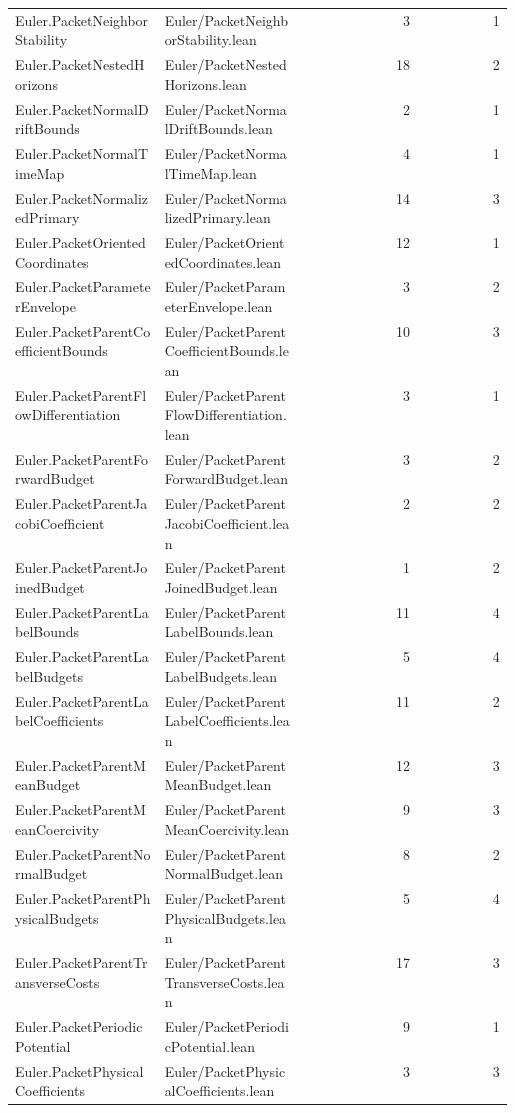 \begin{longtable}{p{0.30\linewidth}p{0.28\linewidth}rr}
Euler.PacketNeighborStability & Euler/PacketNeighborStability.lean & 3 & 1\\
Euler.PacketNestedHorizons & Euler/PacketNestedHorizons.lean & 18 & 2\\
Euler.PacketNormalDriftBounds & Euler/PacketNormalDriftBounds.lean & 2 & 1\\
Euler.PacketNormalTimeMap & Euler/PacketNormalTimeMap.lean & 4 & 1\\
Euler.PacketNormalizedPrimary & Euler/PacketNormalizedPrimary.lean & 14 & 3\\
Euler.PacketOrientedCoordinates & Euler/PacketOrientedCoordinates.lean & 12 & 1\\
Euler.PacketParameterEnvelope & Euler/PacketParameterEnvelope.lean & 3 & 2\\
Euler.PacketParentCoefficientBounds & Euler/PacketParentCoefficientBounds.lean & 10 & 3\\
Euler.PacketParentFlowDifferentiation & Euler/PacketParentFlowDifferentiation.lean & 3 & 1\\
Euler.PacketParentForwardBudget & Euler/PacketParentForwardBudget.lean & 3 & 2\\
Euler.PacketParentJacobiCoefficient & Euler/PacketParentJacobiCoefficient.lean & 2 & 2\\
Euler.PacketParentJoinedBudget & Euler/PacketParentJoinedBudget.lean & 1 & 2\\
Euler.PacketParentLabelBounds & Euler/PacketParentLabelBounds.lean & 11 & 4\\
Euler.PacketParentLabelBudgets & Euler/PacketParentLabelBudgets.lean & 5 & 4\\
Euler.PacketParentLabelCoefficients & Euler/PacketParentLabelCoefficients.lean & 11 & 2\\
Euler.PacketParentMeanBudget & Euler/PacketParentMeanBudget.lean & 12 & 3\\
Euler.PacketParentMeanCoercivity & Euler/PacketParentMeanCoercivity.lean & 9 & 3\\
Euler.PacketParentNormalBudget & Euler/PacketParentNormalBudget.lean & 8 & 2\\
Euler.PacketParentPhysicalBudgets & Euler/PacketParentPhysicalBudgets.lean & 5 & 4\\
Euler.PacketParentTransverseCosts & Euler/PacketParentTransverseCosts.lean & 17 & 3\\
Euler.PacketPeriodicPotential & Euler/PacketPeriodicPotential.lean & 9 & 1\\
Euler.PacketPhysicalCoefficients & Euler/PacketPhysicalCoefficients.lean & 3 & 3\\

\end{longtable}

